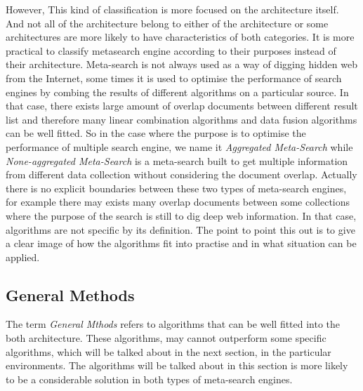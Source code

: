 However, This kind of classification is more focused on the architecture itself. And not all of the architecture belong to either of the architecture or some architectures are more likely to have characteristics of both categories. It is more practical to classify metasearch engine according to their purposes instead of their architecture.  Meta-search is not always used as a way of digging hidden web from the Internet, some times it is used to optimise the performance of search engines by combing the results of different algorithms on a particular source. In that case,  there exists large amount of overlap documents between different result list and therefore many linear combination algorithms and data fusion algorithms can be well fitted. So in the case where the purpose is to optimise the performance of multiple search engine, we name it \textit{Aggregated Meta-Search} while \textit{None-aggregated Meta-Search} is a meta-search built to get multiple information from different data collection without considering the document overlap. Actually there is no explicit boundaries between these two types of meta-search engines, for example there may exists many overlap documents between some collections where the purpose of the search is still to dig deep web information. In that case, algorithms are not specific by its definition. The point to point this out is to give a clear image of how the algorithms fit into practise and in what situation can be applied.

\subsection{General Methods}
The term \textit{General Mthods} refers to algorithms that can be well fitted into the both architecture. These algorithms, may cannot outperform some specific algorithms, which will be  talked about in the next section, in the particular environments. The algorithms will be talked about in this section is more likely to be a considerable solution in both types of meta-search engines.
